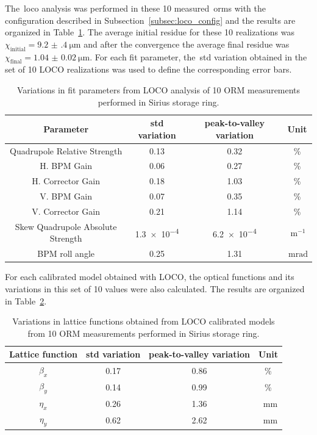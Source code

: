 The~\gls{loco} analysis was performed in these 10 measured~\glspl{orm} with the configuration described in Subsection~\ref{subsec:loco_config} and the results are organized in Table~\ref{tab:fit_var}. The average initial residue for these 10 realizations was $\chi_{\mathrm{initial}} = \SI{9.2(4)}{\micro\meter}$ and after the convergence the average final residue was $\chi_{\mathrm{final}} = \SI{1.04(2)}{\micro\meter}$. For each fit parameter, the~\gls{std} variation obtained in the set of 10 LOCO realizations was used to define the corresponding error bars.
\begin{table}
    \centering
    \caption{Variations in fit parameters from LOCO analysis of 10 ORM measurements performed in Sirius storage ring.}
    \label{tab:fit_var}
    \begin{tabular}{cccc}
        \toprule\toprule
        Parameter & std variation & peak-to-valley variation & Unit \\
        \hline
        Quadrupole Relative Strength     & 0.13 & 0.32 & \% \\  
        H. BPM Gain             & 0.06 & 0.27 & \%\\
        H. Corrector Gain       & 0.18 & 1.03 & \%\\
        V. BPM  Gain             & 0.07 & 0.35 & \%\\
        V. Corrector Gain       & 0.21 & 1.14 & \%\\
        Skew Quadrupole Absolute Strength& \num{1.3e-4} & \num{6.2e-4} & $\SI{}{\meter^{-1}}$\\
        BPM roll angle                & 0.25 & 1.31 & $\SI{}{\milli\radian}$ \\
        \bottomrule\bottomrule
    \end{tabular}
\end{table}

For each calibrated model obtained with LOCO, the optical functions and its variations in this set of 10 values were also calculated. The results are organized in Table~\ref{tab:twiss_var}. 
\begin{table}
    \centering
    \caption{Variations in lattice functions obtained from LOCO calibrated models from 10 ORM measurements performed in Sirius storage ring.}
    \label{tab:twiss_var}
    \begin{tabular}{cccc}
        \toprule\toprule
        Lattice function & std variation & peak-to-valley variation & Unit \\
        \hline
        $\beta_x$ & \num{0.17}& \num{0.86} & \%\\
        $\beta_y$ & \num{0.14} & \num{0.99}& \% \\
        $\eta_x$ & \num{0.26} & \num{1.36} & \SI{}{\milli\meter}\\
        $\eta_y$ & \num{0.62} & \num{2.62} & \SI{}{\milli\meter} \\
        \bottomrule\bottomrule
    \end{tabular}
\end{table}

